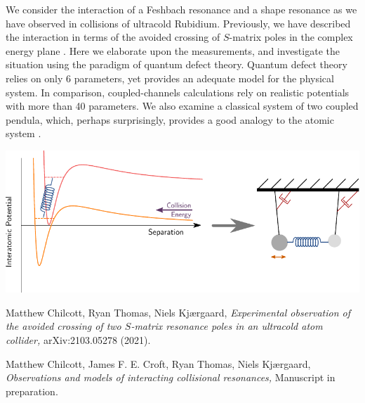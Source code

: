 \documentclass{article}
\begin{document}
We consider the interaction of a Feshbach resonance and a shape
resonance as we have observed in collisions of ultracold
Rubidium. Previously, we have described the interaction in terms of
the avoided crossing of $S$-matrix poles in the complex energy plane
\cite{Chilcott2021A}. Here we elaborate upon the measurements, and
investigate the situation using the paradigm of quantum defect
theory. Quantum defect theory relies on only 6 parameters, yet
provides an adequate model for the physical system. In comparison,
coupled-channels calculations rely on realistic potentials with more
than 40 parameters. We also examine a classical system of two
coupled pendula, which, perhaps surprisingly, provides a good analogy
to the atomic system \cite{ArticleInPrep}.
\vspace{-1em}
\begin{center}
\includegraphics[width=\linewidth]{system.pdf}
\end{center}
\vspace{-3em}
\begin{thebibliography}{1}
 Matthew Chilcott, Ryan Thomas, Niels Kj{\ae}rgaard, {\em Experimental observation of the avoided crossing of two $S$-matrix resonance poles in an ultracold atom collider,} arXiv:2103.05278 (2021).

 Matthew Chilcott, James F. E. Croft, Ryan Thomas, Niels Kj{\ae}rgaard, {\em Observations and models of interacting collisional resonances,} Manuscript in preparation.

\end{thebibliography}
\end{document}
